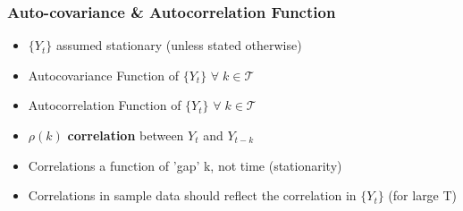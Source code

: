 \documentclass{beamer}
\begin{document}
\begin{frame}
	\frametitle{Auto-covariance \& Autocorrelation Function}
	\normalsize
	
	\begin{itemize}
		\item[]  $\{Y_t\}$ assumed stationary (unless stated otherwise)
		\pause \vspace{10pt}
		\item[]	\begin{mydef*}[width=4.9in]{Autocovariance Function of $\{Y_t\}$}
			 $\forall \; k \in \mathcal{T}$
		\end{mydef*}
		\vspace{8pt}\pause
		\item[]	\begin{mydef*}[width=4.9in]{Autocorrelation Function of $\{Y_t\}$}
			 $\forall \;  k \in \mathcal{T}$
		\end{mydef*}
		\pause
		\vspace{14pt}
		\item[] \hspace{15pt} $\rho(k)$ \textbf{correlation} between $Y_t$ and $Y_{t-k}$ 
		\pause
		\vspace{8pt}
		\item[]\hspace{15pt} Correlations a function of 'gap' k, not time (stationarity)
		
		\pause 	\vspace{5pt}\pause
		\item[]  \hspace{15pt}  Correlations in sample  data should reflect the correlation in $\{Y_t\}$ (for large T)

	\end{itemize}
\end{frame}
\end{document}
